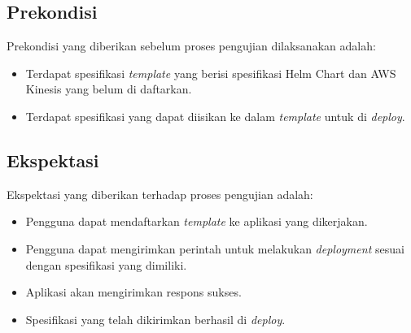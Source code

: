 \subsection{Prekondisi}
Prekondisi yang diberikan sebelum proses pengujian dilaksanakan adalah:
\begin{itemize}
    \item Terdapat spesifikasi \textit{template} yang berisi spesifikasi Helm Chart dan AWS Kinesis yang belum di daftarkan.
    \item Terdapat spesifikasi yang dapat diisikan ke dalam \textit{template} untuk di \textit{deploy}.
\end{itemize}
\subsection{Ekspektasi}
Ekspektasi yang diberikan terhadap proses pengujian adalah:
\begin{itemize}
    \item Pengguna dapat mendaftarkan \textit{template} ke aplikasi yang dikerjakan.
    \item Pengguna dapat mengirimkan perintah untuk melakukan \textit{deployment} sesuai dengan spesifikasi yang dimiliki.
    \item Aplikasi akan mengirimkan respons sukses.
    \item Spesifikasi yang telah dikirimkan berhasil di \textit{deploy}.
\end{itemize}

